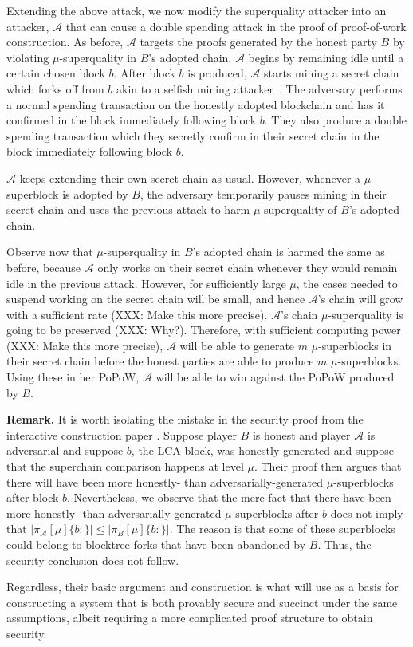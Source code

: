 Extending the above attack, we now modify the superquality attacker into an
attacker, $\mathcal{A}$ that can cause a double spending attack in the proof of
proof-of-work construction. As before, $\mathcal{A}$ targets the proofs
generated by the honest party $B$ by violating $\mu$-superquality in $B$'s
adopted chain. $\mathcal{A}$ begins by remaining idle until a certain chosen
block $b$. After block $b$ is produced, $\mathcal{A}$ starts mining a secret
chain which forks off from $b$ akin to a selfish mining attacker~\cite{selfish}.
The adversary performs a normal spending transaction on the honestly adopted
blockchain and has it confirmed in the block immediately following block $b$.
They also produce a double spending transaction which they secretly confirm in
their secret chain in the block immediately following block $b$.

$\mathcal{A}$ keeps extending their own secret chain as usual. However, whenever
a $\mu$-superblock is adopted by $B$, the adversary temporarily pauses mining in
their secret chain and uses the previous attack to harm $\mu$-superquality of
$B$'s adopted chain.

Observe now that $\mu$-superquality in $B$'s adopted chain is harmed the same as
before, because $\mathcal{A}$ only works on their secret chain whenever they
would remain idle in the previous attack. However, for sufficiently large $\mu$,
the cases needed to suspend working on the secret chain will be small, and hence
$\mathcal{A}$'s chain will grow with a sufficient rate (XXX: Make this more
precise). $\mathcal{A}$'s chain $\mu$-superquality is going to be preserved
(XXX: Why?). Therefore, with sufficient computing power (XXX: Make this more
precise), $\mathcal{A}$ will be able to generate $m$ $\mu$-superblocks in their
secret chain before the honest parties are able to produce $m$
$\mu$-superblocks. Using these in her PoPoW, $\mathcal{A}$ will be able to win
against the PoPoW produced by $B$.

\textbf{Remark.} It is worth isolating the mistake in the security proof from
the interactive construction paper \cite{KLS}. Suppose player $B$ is honest and
player $\mathcal{A}$ is adversarial and suppose $b$, the LCA block, was honestly
generated and suppose that the superchain comparison happens at level $\mu$.
Their proof then argues that there will have been more honestly- than
adversarially-generated $\mu$-superblocks after block $b$. Nevertheless, we
observe that the mere fact that there have been more honestly- than
adversarially-generated $\mu$-superblocks after $b$ does not imply that
$|\overline\pi_\mathcal{A}[\mu]\{b:\}| \leq |\overline\pi_B[\mu]\{b:\}|$. The
reason is that some of these superblocks could belong to blocktree forks that
have been abandoned by $B$. Thus, the security conclusion does not follow.

Regardless, their basic argument and construction is what will use as a basis
for constructing a system that is both provably secure and succinct under the
same assumptions, albeit requiring a more complicated proof structure to obtain
security.
